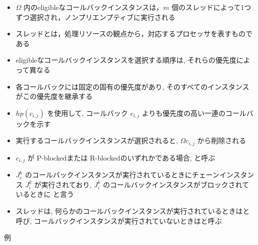 \begin{frame}{}
    \begin{itemize}
        \item $\Omega$ 内のeligibleなコールバックインスタンスは，$m$ 個のスレッドによって1つずつ選択され，ノンプリエンプティブに実行される
        \item スレッドとは，処理リソースの観点から，対応するプロセッサを表すものである
    \end{itemize}
\end{frame}

\begin{frame}{}
    \begin{itemize}
        \item eligibleなコールバックインスタンスを選択する順序は, それらの優先度によって異なる
        \item 各コールバックには固定の固有の優先度があり, そのすべてのインスタンスがこの優先度を継承する
        \item $h p\left(c_{i, j}\right)$ を使用して, コールバック $c_{i, j}$ よりも優先度の高い一連のコールバックを示す
        \item 実行するコールバックインスタンスが選択されると, $\Omega  c_{i, j}$ から削除される
    \end{itemize}
\end{frame}

\begin{frame}{}
    \begin{itemize}
        \item $c_{i, j}$ が P-blockedまたは R-blockedのいずれかである場合, と呼ぶ
        \item $J_{i}^{k}$ のコールバックインスタンスが実行されているときにチェーンインスタンス $J_{i}^{k}$ が実行されており, $J_{i}^{k}$ のコールバックインスタンスがブロックされているときに と言う
        \item スレッドは, 何らかのコールバックインスタンスが実行されているときはと呼び, コールバックインスタンスが実行されていないときはと呼ぶ
    \end{itemize}
\end{frame}

\begin{frame}{例}
\end{frame}


